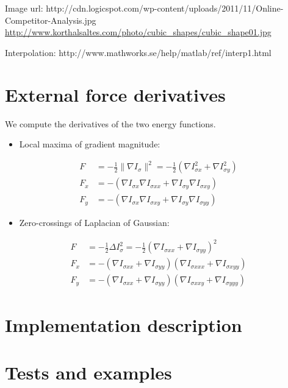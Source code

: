 \documentclass[11pt,a4paper]{article}
\title{}
\author{Malte Stær Nissen}
\begin{document}
\maketitle

Image url: http://cdn.logicspot.com/wp-content/uploads/2011/11/Online-Competitor-Analysis.jpg
\url{http://www.korthalsaltes.com/photo/cubic_shapes/cubic_shape01.jpg}

Interpolation: http://www.mathworks.se/help/matlab/ref/interp1.html

\section{External force derivatives}
%
We compute the derivatives of the two energy functions.
\begin{itemize}
\item Local maxima of gradient magnitude:
\end{itemize}
%
\begin{align}
F &= - \frac12 \| \nabla I_{\sigma} \|^2 = - \frac12 (\nabla I_{\sigma x}^2 + \nabla I_{\sigma y}^2) \\
F_x &= - (\nabla I_{\sigma x} \nabla I_{\sigma xx} + \nabla I_{\sigma y} \nabla I_{\sigma xy}) \\
F_y &= - (\nabla I_{\sigma x} \nabla I_{\sigma xy} + \nabla I_{\sigma y} \nabla I_{\sigma yy})
\end{align}
%
\begin{itemize}
\item Zero-crossings of Laplacian of Gaussian:
\end{itemize}
%
\begin{align}
F &= - \frac12 \Delta I_{\sigma}^2 = - \frac12 (\nabla I_{\sigma xx} + \nabla I_{\sigma yy})^2 \\
F_x &= - (\nabla I_{\sigma xx} + \nabla I_{\sigma yy}) (\nabla I_{\sigma xxx} + \nabla I_{\sigma xyy}) \\
F_y &= - (\nabla I_{\sigma xx} + \nabla I_{\sigma yy}) (\nabla I_{\sigma xxy} + \nabla I_{\sigma yyy})
\end{align}
%

\section{Implementation description}

\section{Tests and examples}
\end{document}

